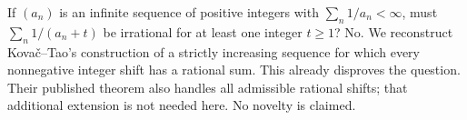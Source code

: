 If $(a_n)$ is an infinite sequence of positive integers with $\sum_n1/a_n<\infty$, must $\sum_n1/(a_n+t)$ be irrational for at least one integer $t\ge1$? No. We reconstruct Kova\v c--Tao's construction of a strictly increasing sequence for which every nonnegative integer shift has a rational sum. This already disproves the question. Their published theorem also handles all admissible rational shifts; that additional extension is not needed here. No novelty is claimed.
